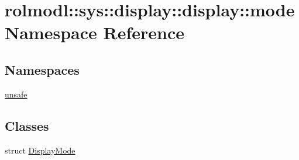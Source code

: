 \hypertarget{namespacerolmodl_1_1sys_1_1display_1_1display_1_1mode}{}\section{rolmodl\+::sys\+::display\+::display\+::mode Namespace Reference}
\label{namespacerolmodl_1_1sys_1_1display_1_1display_1_1mode}
\subsection*{Namespaces}
\begin{DoxyCompactItemize}
\item 
 \mbox{\hyperlink{namespacerolmodl_1_1sys_1_1display_1_1display_1_1mode_1_1unsafe}{unsafe}}
\end{DoxyCompactItemize}
\subsection*{Classes}
\begin{DoxyCompactItemize}
\item 
struct \mbox{\hyperlink{structrolmodl_1_1sys_1_1display_1_1display_1_1mode_1_1_display_mode}{Display\+Mode}}
\end{DoxyCompactItemize}
